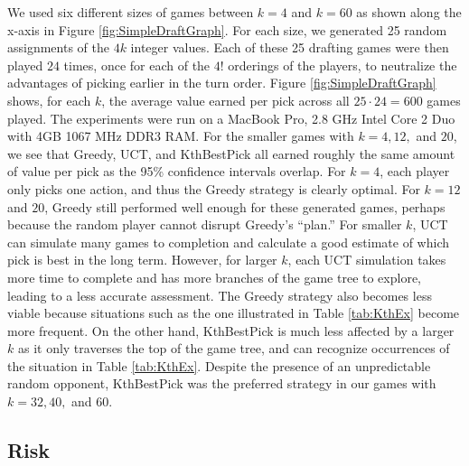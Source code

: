 \documentclass[letterpaper]{article}
\numberwithin{equation}{section}
\numberwithin{theorem}{section}
\numberwithin{lemma}{section}
\numberwithin{df}{section}
\begin{document}
We used six different sizes of games between $k=4$ and $k=60$ as shown along the x-axis in Figure \ref{fig:SimpleDraftGraph}.  For each size, we generated 25 random assignments of the $4k$ integer values.  Each of these 25 drafting games were then played $24$ times, once for each of the $4!$ orderings of the players, to neutralize the advantages of picking earlier in the turn order.  Figure \ref{fig:SimpleDraftGraph} shows, for each $k$, the average value earned per pick across all $25 \cdot 24 = 600$ games played.  The experiments were run on a MacBook Pro, 2.8 GHz Intel Core 2 Duo with 4GB 1067 MHz DDR3 RAM.  For the smaller games with $k=4,12,$ and $20$, we see that Greedy, UCT, and KthBestPick all earned roughly the same amount of value per pick as the 95\% confidence intervals overlap.  For $k=4$, each player only picks one action, and thus the Greedy strategy is clearly optimal.  For $k=12$ and $20$, Greedy still performed well enough for these generated games, perhaps because the random player cannot disrupt Greedy's ``plan.''  For smaller $k$, UCT can simulate many games to completion and calculate a good estimate of which pick is best in the long term.  However, for larger $k$, each UCT simulation takes more time to complete and has more branches of the game tree to explore, leading to a less accurate assessment.  The Greedy strategy also becomes less viable because situations such as the one illustrated in Table \ref{tab:KthEx} become more frequent.  On the other hand, KthBestPick is much less affected by a larger $k$ as it only traverses the top of the game tree, and can recognize occurrences of the situation in Table \ref{tab:KthEx}.  Despite the presence of an unpredictable random opponent, KthBestPick was the preferred strategy in our games with $k=32,40,$ and $60$.

\subsection{Risk}
\end{document}

